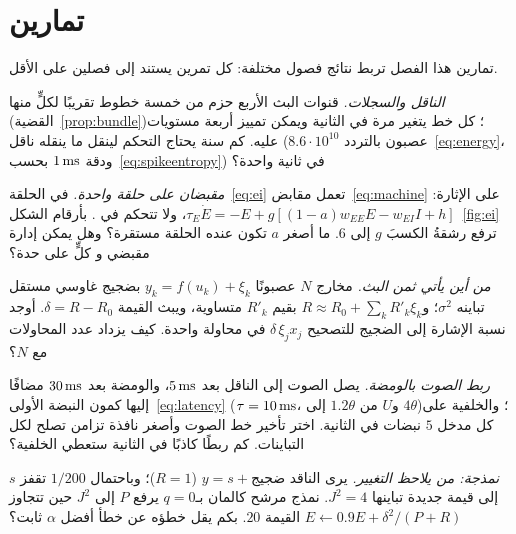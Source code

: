 \section{تمارين}

تمارين هذا الفصل تربط نتائج فصول مختلفة: كل تمرين يستند إلى فصلين على الأقل.

\begin{exercise}[\lvlA]
\label{ex:10:1}
\emph{الناقل والسجلات.} قنوات البث الأربع حزم من خمسة خطوط تقريبًا لكلٍّ منها (القضية~\ref{prop:bundle})؛ كل خط يتغير مرة في الثانية ويمكن تمييز أربعة مستويات عليه. كم سنة يحتاج التحكم لينقل ما ينقله ناقل  ($8.6\cdot10^{10}$ عصبون بالتردد~\eqref{eq:energy}، ودقة $1\,\text{ms}$ بحسب~\eqref{eq:spikeentropy}) في ثانية واحدة؟
\end{exercise}

\begin{exercise}[\lvlB]
\label{ex:10:2}
\emph{مقبضان على حلقة واحدة.} في الحلقة~\eqref{eq:ei} تعمل مقابض~\eqref{eq:machine} على الإثارة: $\tau_E\dot E=-E+g[(1-a)w_{EE}E-w_{EI}I+h]$، ولا تتحكم في . بأرقام الشكل~\ref{fig:ei} ترفع رشقةُ  الكسبَ $g$ إلى $6$. ما أصغر $a$ تكون عنده الحلقة مستقرة؟ وهل يمكن إدارة مقبضي  و كلٍّ على حدة؟
\end{exercise}

\begin{exercise}[\lvlB]
\label{ex:10:3}
\emph{من أين يأتي ثمن البث.} مخارج $N$ عصبونًا $y_k=f(u_k)+\xi_k$ بضجيج غاوسي مستقل تباينه $\sigma^2$؛ و$R\approx R_0+\sum_kR'_k\xi_k$ بقيم $R'_k$ متساوية، ويبث  القيمة $\delta=R-R_0$. أوجد نسبة الإشارة إلى الضجيج للتصحيح $\delta\,\xi_jx_j$ في محاولة واحدة. كيف يزداد عدد المحاولات مع $N$؟
\end{exercise}

\begin{exercise}[\lvlB]
\label{ex:10:4}
\emph{ربط الصوت بالومضة.} يصل الصوت إلى الناقل بعد $5\,\text{ms}$، والومضة بعد $30\,\text{ms}$ مضافًا إليها كمون النبضة الأولى~\eqref{eq:latency} ($\tau=10\,\text{ms}$، و$U$ من $1.2\theta$ إلى $4\theta$)؛ والخلفية على كل مدخل $5$ نبضات في الثانية. اختر تأخير خط الصوت وأصغر نافذة تزامن تصلح لكل التباينات. كم ربطًا كاذبًا في الثانية ستعطي الخلفية؟
\end{exercise}

\begin{exercise}[\lvlB]
\label{ex:10:5}
\emph{نمذجة: من يلاحظ التغيير.} يرى الناقد $y=s+\text{ضجيج}$ ($R=1$)؛ وباحتمال $1/200$ تقفز $s$ إلى قيمة جديدة تباينها $J^2=4$. نمذج مرشح كالمان بـ$q=0$ يرفع $P$ إلى $J^2$ حين تتجاوز $E\leftarrow0.9E+\delta^2/(P+R)$ القيمة $20$. بكم يقل خطؤه عن خطأ أفضل $\alpha$ ثابت؟
\end{exercise}

